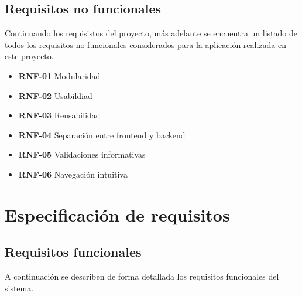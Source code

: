 \subsection{Requisitos no funcionales}

Continuando los requisistos del proyecto, más adelante se encuentra un listado de todos los requisitos no funcionales considerados para la aplicación realizada en este proyecto.

\begin{itemize}
    \item \textbf{RNF-01} Modularidad

    \item \textbf{RNF-02} Usabildiad

    \item \textbf{RNF-03} Reusabilidad

    \item \textbf{RNF-04} Separación entre frontend y backend

    \item \textbf{RNF-05} Validaciones informativas

    \item \textbf{RNF-06} Navegación intuitiva
\end{itemize}

\section{Especificación de requisitos}

\subsection{Requisitos funcionales}

A continuación se describen de forma detallada los requisitos funcionales del sistema.

